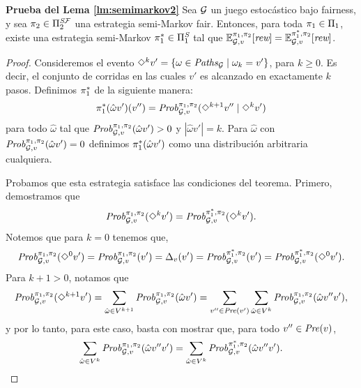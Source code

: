 \noindent
\textbf{Prueba del Lema \ref{lm:semimarkov2}}
  Sea $\mathcal{G}$ un juego estocástico bajo fairness,  y sea
  $\pi_{2} \in \Pi^{\textit{S}\mathcal{F}}_{2}$ una estrategia semi-Markov
  fair. Entonces, para toda $\pi_{1} \in \Pi_{1}$, existe una estrategia
  semi-Markov $\pi^*_{1} \in \Pi^{\textit{S}}_{1}$
  tal que
  $\mathbb{E}^{\pi_{1}, \pi_{2}}_{\mathcal{G}, v}[\textit{rew}] =
  \mathbb{E}^{\pi^*_{1}, \pi_{2}}_{\mathcal{G}, v}[\textit{rew}]$.
\noindent \\
%
\begin{proof}
  Consideremos el evento $\Diamond^{k} v' = \{ \omega \in
  \mathit{Paths}_{\mathcal{G}} \mid \omega_k = v'\}$, para $k\geq 0$. Es decir,
  el conjunto de corridas en las cuales $v'$ es alcanzado en exactamente $k$ pasos.
  Definimos $\pi^*_{1}$ de la siguiente manera:
  \[
  \pi^*_{1}(\hat{\omega}v')(v'') =  \mathit{Prob}^{\pi_{1}, \pi_{2}}_{\mathcal{G},v}(\Diamond^{k+1} v'' \mid \Diamond^k v') 
  \]
  para todo $\hat{\omega}$ tal que
  $\mathit{Prob}^{\pi_{1}, \pi_{2}}_{\mathcal{G},v}(\hat{\omega}v') > 0$ y
  $|\hat{\omega}v'| = k$.  Para $\hat{\omega}$ con
  $\mathit{Prob}^{\pi_{1}, \pi_{2}}_{\mathcal{G},v}(\hat{\omega}v') = 0$ definimos $\pi^*_{1}(\hat{\omega}v')$ como una distribución arbitraria cualquiera.

  Probamos que esta estrategia satisface las condiciones del teorema.
  Primero, demostramos que
  \begin{equation}\label{equ:diamondk}
    \mathit{Prob}^{\pi_{1}, \pi_{2}}_{\mathcal{G},v}(\Diamond^{k} v') =
    \mathit{Prob}^{\pi^*_{1}, \pi_{2}}_{\mathcal{G},v}(\Diamond^{k} v').
  \end{equation}
  Notemos que para $k=0$ tenemos que,
  \[\mathit{Prob}^{\pi_{1}, \pi_{2}}_{\mathcal{G},v}(\Diamond^{0} v') =
  \mathit{Prob}^{\pi_{1}, \pi_{2}}_{\mathcal{G},v}(v') = \Delta_v(v') =
  \mathit{Prob}^{\pi^*_{1}, \pi_{2}}_{\mathcal{G},v}(v')=
  \mathit{Prob}^{\pi^*_{1}, \pi_{2}}_{\mathcal{G},v}(\Diamond^{0} v').\]
  Para $k + 1 > 0$, notamos que
  \[
  \mathit{Prob}^{\pi_{1}, \pi_{2}}_{\mathcal{G},v}(\Diamond^{k+1} v') = \sum_{\hat{\omega} \in V^{k+1}} \mathit{Prob}^{\pi_{1}, \pi_{2}}_{\mathcal{G},v}(\hat{\omega}v')  = \sum_{v'' \in \mathit{Pre}(v')}\sum_{\hat{\omega} \in V^k} \mathit{Prob}^{\pi_{1}, \pi_{2}}_{\mathcal{G},v}(\hat{\omega}v''v'),
  \] 
  y por lo tanto, para este caso, basta con mostrar que, para todo
  $v''\in\mathit{Pre}(v)$,
  \[
    \sum_{\hat{\omega} \in V^k} \mathit{Prob}^{\pi_{1}, \pi_{2}}_{\mathcal{G},v}(\hat{\omega}v''v') = \sum_{\hat{\omega} \in V^k} \mathit{Prob}^{\pi^*_{1}, \pi_{2}}_{\mathcal{G},v}(\hat{\omega}v''v').
  \]


\end{proof}
